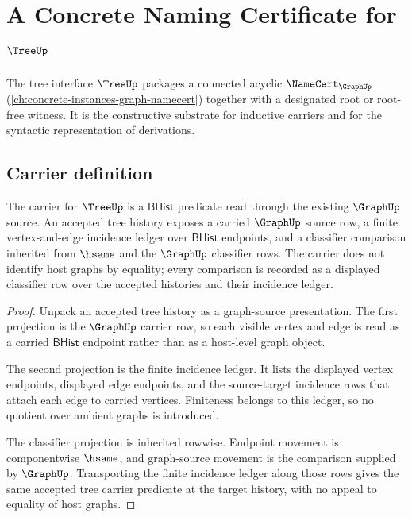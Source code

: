 \chapter{A Concrete Naming Certificate for $\TreeUp$}
\label{ch:concrete-instances-tree-namecert}

The tree interface $\TreeUp$ packages a connected acyclic $\NameCert_{\GraphUp}$ (\autoref{ch:concrete-instances-graph-namecert}) together with a designated root or root-free witness. It is the constructive substrate for inductive carriers and for the syntactic representation of derivations.

\section{Carrier definition}
\label{sec:tree-carrier}

\begin{theorem}
\label{thm:tree-graph-source-carrier-obligation}
The carrier for $\TreeUp$ is a $\mathsf{BHist}$ predicate read through the
existing $\GraphUp$ source. An accepted tree history exposes a carried
$\GraphUp$ source row, a finite vertex-and-edge incidence ledger over
$\mathsf{BHist}$ endpoints, and a classifier comparison inherited from
$\hsame$ and the $\GraphUp$ classifier rows. The carrier does not identify
host graphs by equality; every comparison is recorded as a displayed
classifier row over the accepted histories and their incidence ledger.
\end{theorem}
\begin{proof}
Unpack an accepted tree history as a graph-source presentation. The first
projection is the $\GraphUp$ carrier row, so each visible vertex and edge is
read as a carried $\mathsf{BHist}$ endpoint rather than as a host-level graph
object.

The second projection is the finite incidence ledger. It lists the displayed
vertex endpoints, displayed edge endpoints, and the source-target incidence
rows that attach each edge to carried vertices. Finiteness belongs to this
ledger, so no quotient over ambient graphs is introduced.

The classifier projection is inherited rowwise. Endpoint movement is
componentwise $\hsame$, and graph-source movement is the comparison supplied
by $\GraphUp$. Transporting the finite incidence ledger along those rows gives
the same accepted tree carrier predicate at the target history, with no
appeal to equality of host graphs.
\end{proof}

